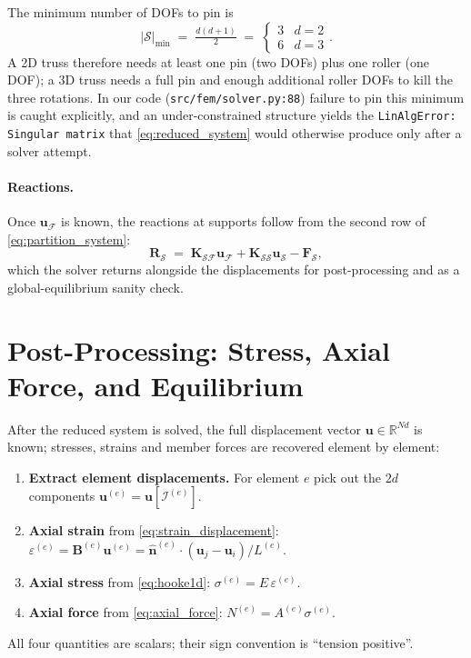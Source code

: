 The minimum number of DOFs to pin is
\begin{equation}
  |\mathcal{S}|_{\min}\;=\;\tfrac{d(d+1)}{2}
  \;=\;\begin{cases}3 & d=2\\6 & d=3\end{cases}.
\end{equation}
A 2D truss therefore needs at least one pin (two DOFs) plus one
roller (one DOF); a 3D truss needs a full pin and enough
additional roller DOFs to kill the three rotations. In our code
(\texttt{src/fem/solver.py:88}) failure to pin this minimum is
caught explicitly, and an under-constrained structure yields the
\texttt{LinAlgError: Singular matrix} that
\cref{eq:reduced_system} would otherwise produce only after a
solver attempt.

\paragraph{Reactions.} Once $\mathbf{u}_{\mathcal{F}}$ is known,
the reactions at supports follow from the second row of
\cref{eq:partition_system}:
\begin{equation}
  \mathbf{R}_{\mathcal{S}}
  \;=\;\mathbf{K}_{\mathcal{S}\mathcal{F}}\mathbf{u}_{\mathcal{F}}
  +\mathbf{K}_{\mathcal{S}\mathcal{S}}\mathbf{u}_{\mathcal{S}}
  -\mathbf{F}_{\mathcal{S}},
  \label{eq:reactions}
\end{equation}
which the solver returns alongside the displacements for
post-processing and as a global-equilibrium sanity check.

\section{Post-Processing: Stress, Axial Force, and Equilibrium}
\label{app:fem:postprocess}

After the reduced system is solved, the full displacement vector
$\mathbf{u}\in\mathbb{R}^{Nd}$ is known; stresses, strains and
member forces are recovered element by element:
\begin{enumerate}
  \item \textbf{Extract element displacements.} For element $e$
    pick out the $2d$ components
    $\mathbf{u}^{(e)}=\mathbf{u}[\mathcal{I}^{(e)}]$.
  \item \textbf{Axial strain} from
    \cref{eq:strain_displacement}:
    $\varepsilon^{(e)}=\mathbf{B}^{(e)}\mathbf{u}^{(e)}
    =\hat{\mathbf{n}}^{(e)}\!\cdot\!(\mathbf{u}_j-\mathbf{u}_i)/L^{(e)}$.
  \item \textbf{Axial stress} from \cref{eq:hooke1d}:
    $\sigma^{(e)}=E\,\varepsilon^{(e)}$.
  \item \textbf{Axial force} from \cref{eq:axial_force}:
    $N^{(e)}=A^{(e)}\sigma^{(e)}$.
\end{enumerate}
All four quantities are scalars; their sign convention is
``tension positive''.

